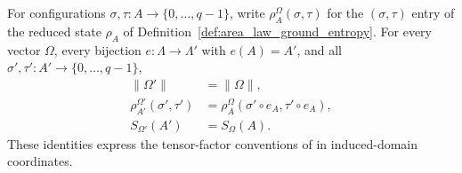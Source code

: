 \begin{lemma}
    \label{thm:area_law_regional_relabelling}
    \leanok
    For configurations $\sigma,\tau:A\to\{0,\ldots,q-1\}$, write
    $\rho_A^\Omega(\sigma,\tau)$ for the $(\sigma,\tau)$ entry of the
    reduced state $\rho_A$ of Definition~\ref{def:area_law_ground_entropy}.
    For every vector $\Omega$, every bijection $e:\Lambda\to\Lambda'$ with
    $e(A)=A'$, and all $\sigma',\tau':A'\to\{0,\ldots,q-1\}$,
    \begin{align}
        \|\Omega'\|                        & =\|\Omega\|,
        \label{eq:area_law_relabel_norm}                                                      \\
        \rho_{A'}^{\Omega'}(\sigma',\tau') & =\rho_A^\Omega(\sigma'\circ e_A,\tau'\circ e_A),
        \label{eq:area_law_relabel_reduction}                                                 \\
        S_{\Omega'}(A')                    & =S_\Omega(A).
        \label{eq:area_law_relabel_entropy}
    \end{align}
    These identities express the tensor-factor conventions of
    \cite[Section~2]{OpenAI2026AreaLaw} in induced-domain coordinates.
\end{lemma}
